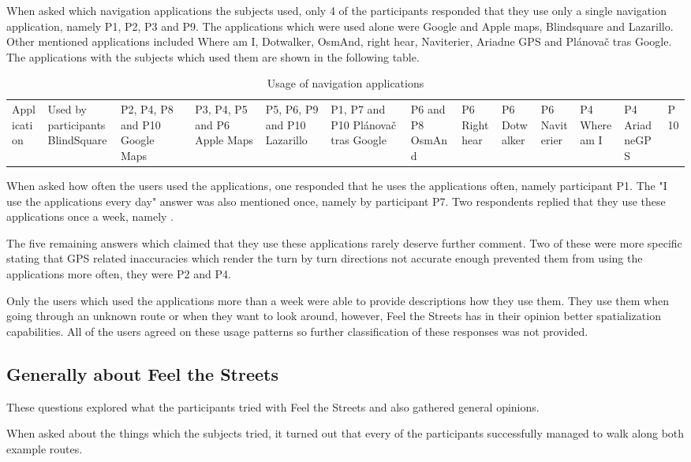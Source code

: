 \documentclass[nolof,digital]{fithesis3}
\begin{document}
When asked which navigation applications the subjects used, only 4 of the participants responded that they use only a single navigation application, namely P1, P2, P3 and P9. The applications which were used alone were Google and Apple maps, Blindsquare and Lazarillo. Other mentioned applications included Where am I, Dotwalker, OsmAnd, right hear, Naviterier, Ariadne GPS and Plánovač tras Google. The applications with the subjects which used them are shown in the following table.

\begin{table}
\caption{Usage of navigation applications}
\begin{tabularx}{\textwidth}{|X|X|}
Application & Used by participants
\hline
BlindSquare & P2, P4, P8 and P10
Google Maps & P3, P4, P5 and P6
Apple Maps & P5, P6, P9 and P10
Lazarillo & P1, P7 and P10
Plánovač tras Google & P6 and P8
OsmAnd & P6
Right hear & P6
Dotwalker & P6
Naviterier & P4
Where am I & P4
AriadneGPS & P10
\end{tabularx}
\end{table}

When asked how often the users used the applications, one responded that he uses the applications often, namely participant P1. The "I use the applications every day" answer was also mentioned once, namely by participant P7. Two respondents replied that they use these applications once a week, namely .

The five remaining answers which claimed that they use these applications rarely deserve further comment. Two of these were more specific stating that GPS related inaccuracies which render the turn by turn directions not accurate enough prevented them from using the applications more often, they were P2 and P4.

Only the users which used the applications more than a week were able to provide descriptions how they use them. They use them when going through an unknown route or when they want to look around, however, Feel the Streets has in their opinion better spatialization capabilities. All of the users agreed on these usage patterns so further classification of these responses was not provided.
\subsection{Generally about Feel the Streets}
These questions explored what the participants tried with Feel the Streets and also gathered general opinions.

When asked about the things which the subjects tried, it turned out that every of the participants successfully managed to walk along both example routes.
\end{document}
